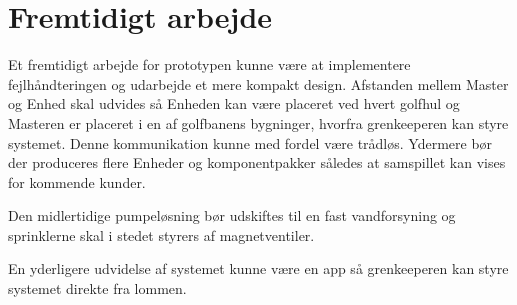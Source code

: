 \chapter{Fremtidigt arbejde}

Et fremtidigt arbejde for prototypen kunne være at implementere fejlhåndteringen og udarbejde et mere kompakt design. Afstanden mellem Master og Enhed skal udvides så Enheden kan være placeret ved hvert golfhul og Masteren er placeret i en af golfbanens bygninger, hvorfra grenkeeperen kan styre systemet. Denne kommunikation kunne med fordel være trådløs. Ydermere bør der produceres flere Enheder og komponentpakker således at samspillet kan vises for kommende kunder. 

Den midlertidige pumpeløsning bør udskiftes til en fast vandforsyning og sprinklerne skal i stedet styrers af magnetventiler. 

 

En yderligere udvidelse af systemet kunne være en app så grenkeeperen kan styre systemet direkte fra lommen. 